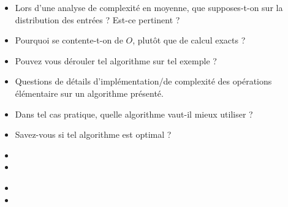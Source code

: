 \documentclass{agregfiche}
\begin{document}
\secquestionsclassiques

\begin{itemize}
	\item Lors d'une analyse de complexité en moyenne, que supposes-t-on sur la distribution des entrées ? Est-ce pertinent ?
    \item Pourquoi se contente-t-on de $O$, plutôt que de calcul exacts ?
    \item Pouvez vous dérouler tel algorithme sur tel exemple ?
    \item Questions de détails d'implémentation/de complexité des opérations élémentaire sur un algorithme présenté.
    \item Dans tel cas pratique, quelle algorithme vaut-il mieux utiliser ?
    \item Savez-vous si tel algorithme est optimal ?
    
\end{itemize}

\secreferences

\begin{itemize}
\item 
\item 

\end{itemize}

\secdev

\begin{itemize}
\item 
\item 
\end{itemize}
\end{document}
